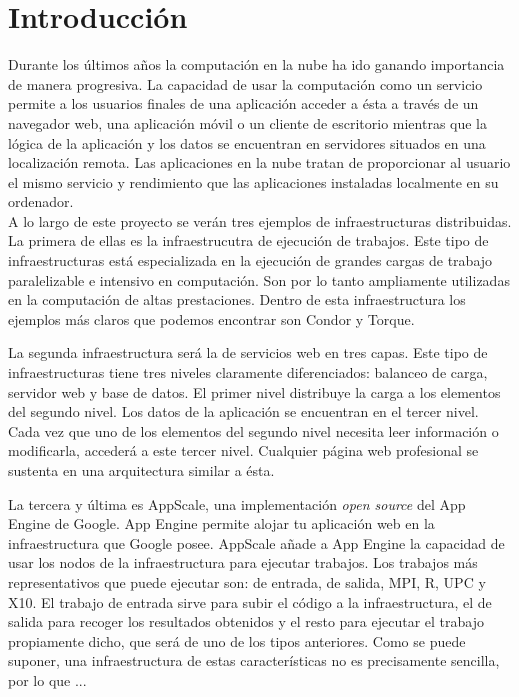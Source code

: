 \chapter{Introducción}
\label{cap:introduccion}


Durante los últimos años la computación en la nube ha ido ganando importancia de manera progresiva. La capacidad de usar la computación como un servicio permite a los usuarios finales de una aplicación acceder a ésta a través de un navegador web, una aplicación móvil o un cliente de escritorio mientras que la lógica de la aplicación y los datos se encuentran en servidores situados en una localización remota. Las aplicaciones en la nube tratan de proporcionar al usuario el mismo servicio y rendimiento que las aplicaciones instaladas localmente en su ordenador.\\

A lo largo de este proyecto se verán tres ejemplos de infraestructuras distribuidas.
La primera de ellas es la infraestrucutra de ejecución de trabajos. Este tipo de infraestructuras está especializada en la ejecución de grandes cargas de trabajo paralelizable e intensivo en computación. Son por lo tanto ampliamente utilizadas en la computación de altas prestaciones. Dentro de esta infraestructura los ejemplos más claros que podemos encontrar son Condor y Torque.

La segunda infraestructura será la de servicios web en tres capas. Este tipo de infraestructuras tiene tres niveles claramente diferenciados: balanceo de carga, servidor web y base de datos. El primer nivel distribuye la carga a los elementos del segundo nivel. Los datos de la aplicación se encuentran en el tercer nivel. Cada vez que uno de los elementos del segundo nivel necesita leer información o modificarla, accederá a este tercer nivel. Cualquier página web profesional se sustenta en una arquitectura similar a ésta.

La tercera y última es AppScale, una implementación \emph{open source} del App Engine de Google. App Engine permite alojar tu aplicación web en la infraestructura que Google posee. AppScale añade a App Engine la capacidad de usar los nodos de la infraestructura para ejecutar trabajos. Los trabajos más representativos que puede ejecutar son: de entrada, de salida, MPI, R, UPC y X10. El trabajo de entrada sirve para subir el código a la infraestructura, el de salida para recoger los resultados obtenidos y el resto para ejecutar el trabajo propiamente dicho, que será de uno de los tipos anteriores. Como se puede suponer, una infraestructura de estas características no es precisamente sencilla, por lo que ...\\

